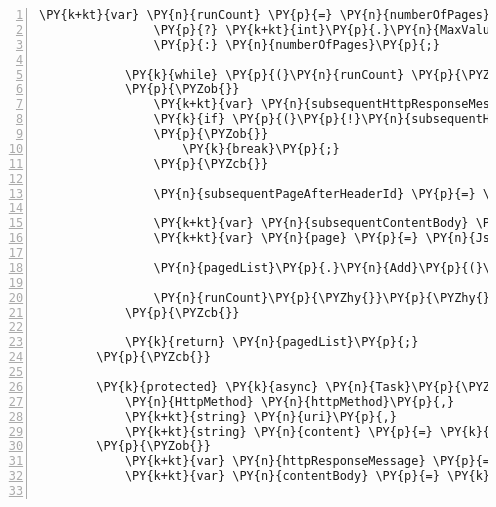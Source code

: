 \begin{Verbatim}[commandchars=\\\{\},numbers=left,firstnumber=1,stepnumber=1,numberblanklines=0]
            \PY{k+kt}{var} \PY{n}{runCount} \PY{p}{=} \PY{n}{numberOfPages} \PY{p}{=}\PY{p}{=} \PY{l+m}{0}
                \PY{p}{?} \PY{k+kt}{int}\PY{p}{.}\PY{n}{MaxValue}
                \PY{p}{:} \PY{n}{numberOfPages}\PY{p}{;}

            \PY{k}{while} \PY{p}{(}\PY{n}{runCount} \PY{p}{\PYZgt{}} \PY{l+m}{1}\PY{p}{)}
            \PY{p}{\PYZob{}}
                \PY{k+kt}{var} \PY{n}{subsequentHttpResponseMessage} \PY{p}{=} \PY{k}{await} \PY{n}{SendHttpRequestMessageAsync}\PY{p}{(}\PY{n}{HttpMethod}\PY{p}{.}\PY{n}{Get}\PY{p}{,} \PY{n}{uri} \PY{p}{+} \PY{err}{\PYZdl{}}\PY{l+s}{\PYZdq{}\PYZam{}after=\PYZob{}subsequentPageAfterHeaderId\PYZcb{}\PYZdq{}}\PY{p}{)}\PY{p}{.}\PY{n}{ConfigureAwait}\PY{p}{(}\PY{k}{false}\PY{p}{)}\PY{p}{;}
                \PY{k}{if} \PY{p}{(}\PY{p}{!}\PY{n}{subsequentHttpResponseMessage}\PY{p}{.}\PY{n}{Headers}\PY{p}{.}\PY{n}{TryGetValues}\PY{p}{(}\PY{l+s}{\PYZdq{}cb\PYZhy{}after\PYZdq{}}\PY{p}{,} \PY{k}{out} \PY{k+kt}{var} \PY{n}{cursorHeaders}\PY{p}{)}\PY{p}{)}
                \PY{p}{\PYZob{}}
                    \PY{k}{break}\PY{p}{;}
                \PY{p}{\PYZcb{}}

                \PY{n}{subsequentPageAfterHeaderId} \PY{p}{=} \PY{n}{cursorHeaders}\PY{p}{.}\PY{n}{First}\PY{p}{(}\PY{p}{)}\PY{p}{;}

                \PY{k+kt}{var} \PY{n}{subsequentContentBody} \PY{p}{=} \PY{k}{await} \PY{n}{httpClient}\PY{p}{.}\PY{n}{ReadAsStringAsync}\PY{p}{(}\PY{n}{subsequentHttpResponseMessage}\PY{p}{)}\PY{p}{.}\PY{n}{ConfigureAwait}\PY{p}{(}\PY{k}{false}\PY{p}{)}\PY{p}{;}
                \PY{k+kt}{var} \PY{n}{page} \PY{p}{=} \PY{n}{JsonConfig}\PY{p}{.}\PY{n}{DeserializeObject}\PY{p}{\PYZlt{}}\PY{n}{IList}\PY{p}{\PYZlt{}}\PY{n}{T}\PY{p}{\PYZgt{}}\PY{p}{\PYZgt{}}\PY{p}{(}\PY{n}{subsequentContentBody}\PY{p}{)}\PY{p}{;}

                \PY{n}{pagedList}\PY{p}{.}\PY{n}{Add}\PY{p}{(}\PY{n}{page}\PY{p}{)}\PY{p}{;}

                \PY{n}{runCount}\PY{p}{\PYZhy{}}\PY{p}{\PYZhy{}}\PY{p}{;}
            \PY{p}{\PYZcb{}}

            \PY{k}{return} \PY{n}{pagedList}\PY{p}{;}
        \PY{p}{\PYZcb{}}

        \PY{k}{protected} \PY{k}{async} \PY{n}{Task}\PY{p}{\PYZlt{}}\PY{n}{T}\PY{p}{\PYZgt{}} \PY{n}{SendServiceCall}\PY{p}{\PYZlt{}}\PY{n}{T}\PY{p}{\PYZgt{}}\PY{p}{(}
            \PY{n}{HttpMethod} \PY{n}{httpMethod}\PY{p}{,}
            \PY{k+kt}{string} \PY{n}{uri}\PY{p}{,}
            \PY{k+kt}{string} \PY{n}{content} \PY{p}{=} \PY{k}{null}\PY{p}{)}
        \PY{p}{\PYZob{}}
            \PY{k+kt}{var} \PY{n}{httpResponseMessage} \PY{p}{=} \PY{k}{await} \PY{n}{SendHttpRequestMessageAsync}\PY{p}{(}\PY{n}{httpMethod}\PY{p}{,} \PY{n}{uri}\PY{p}{,} \PY{n}{content}\PY{p}{)}\PY{p}{;}
            \PY{k+kt}{var} \PY{n}{contentBody} \PY{p}{=} \PY{k}{await} \PY{n}{httpClient}\PY{p}{.}\PY{n}{ReadAsStringAsync}\PY{p}{(}\PY{n}{httpResponseMessage}\PY{p}{)}\PY{p}{.}\PY{n}{ConfigureAwait}\PY{p}{(}\PY{k}{false}\PY{p}{)}\PY{p}{;}


\end{Verbatim}

